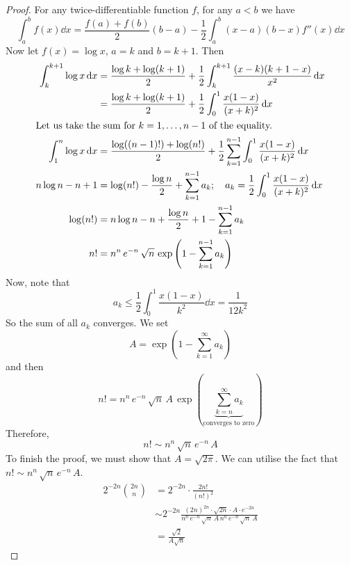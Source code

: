\begin{proof}
	For any twice-differentiable function \(f\), for any \(a < b\) we have
	\[
		\int_a^b f(x) \dd{x} = \frac{f(a) + f(b)}{2} (b - a) - \frac{1}{2}\int_a^b (x-a)(b-x)f''(x)\dd{x}
	\]
	Now let \(f(x) = \log x\), \(a=k\) and \(b=k+1\).
	Then
	\begin{align*}
		\int_k^{k+1} \log x \dd{x} & = \frac{\log k + \log(k+1)}{2} + \frac{1}{2}\int_k^{k+1} \frac{(x-k)(k+1-x)}{x^2}\dd{x}                            \\
		                           & = \frac{\log k + \log(k+1)}{2} + \frac{1}{2}\int_0^1 \frac{x(1-x)}{(x+k)^2}\dd{x}                                  \\
		\intertext{Let us take the sum for \(k=1, \dots, n-1\) of the equality.}
		\int_1^n \log x \dd{x}     & = \frac{\log ((n-1)!) + \log(n!)}{2} + \frac{1}{2}\sum_{k=1}^{n-1}\int_0^1 \frac{x(1-x)}{(x+k)^2}\dd{x}            \\
		n\log n - n + 1            & = \log (n!) - \frac{\log n}{2} + \sum_{k=1}^{n-1} a_k;\quad a_k = \frac{1}{2}\int_0^1 \frac{x(1-x)}{(x+k)^2}\dd{x} \\
		\log (n!)                  & = n \log n - n + \frac{\log n}{2} + 1 - \sum_{k=1}^{n-1} a_k                                                       \\
		n!
		                           & = n^n \, e^{-n} \, \sqrt n \, \exp\left( 1 - \sum_{k=1}^{n-1} a_k \right)
	\end{align*}
	Now, note that
	\[
		a_k \leq \frac{1}{2}\int_0^1 \frac{x(1-x)}{k^2}\dd{x} = \frac{1}{12k^2}
	\]
	So the sum of all \(a_k\) converges.
	We set
	\[
		A = \exp\left( 1 - \sum_{k=1}^\infty a_k \right)
	\]
	and then
	\[
		n!
		= n^n \, e^{-n} \, \sqrt n \, A \, \exp\left( \underbrace{\sum_{k=n}^\infty a_k}_{\text{converges to zero}} \right)
	\]
	Therefore,
	\[
		n!
		\sim n^n\, \sqrt{n}\, e^{-n}\, A
	\]
	To finish the proof, we must show that \(A = \sqrt{2 \pi}\).
	We can utilise the fact that \(n!
	\sim n^n\, \sqrt{n}\, e^{-n}\, A\).
	\begin{align*}
		2^{-2n} \binom{2n}{n} & = 2^{-2n} \cdot \frac{2n!}{(n!)^2}                                                                                           \\
		                      & \sim 2^{-2n} \frac{(2n)^{2n} \cdot \sqrt{2n} \cdot A \cdot e^{-2n}}{n^n\, e^{-n}\, \sqrt n\, A\, n^n\, e^{-n}\, \sqrt n\, A} \\
		                      & = \frac{\sqrt{2}}{A\sqrt{n}}
	\end{align*}

\end{proof}
